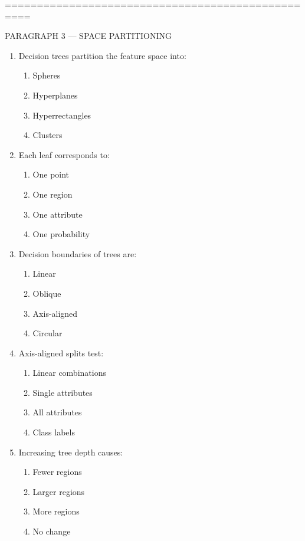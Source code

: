 \documentclass[3pt]{article}
\begin{document}
\vspace{0.3em}

	==================================================
	
	PARAGRAPH 3 — SPACE PARTITIONING
	
	\begin{enumerate}
		\item Decision trees partition the feature space into:
		\begin{enumerate}
			\item Spheres
			\item Hyperplanes
			\item Hyperrectangles
			\item Clusters
		\end{enumerate}
		
		\item Each leaf corresponds to:
		\begin{enumerate}
			\item One point
			\item One region
			\item One attribute
			\item One probability
		\end{enumerate}
		
		\item Decision boundaries of trees are:
		\begin{enumerate}
			\item Linear
			\item Oblique
			\item Axis-aligned
			\item Circular
		\end{enumerate}
		
		\item Axis-aligned splits test:
		\begin{enumerate}
			\item Linear combinations
			\item Single attributes
			\item All attributes
			\item Class labels
		\end{enumerate}
		
		\item Increasing tree depth causes:
		\begin{enumerate}
			\item Fewer regions
			\item Larger regions
			\item More regions
			\item No change
		\end{enumerate}
		

\end{enumerate}
\end{document}
